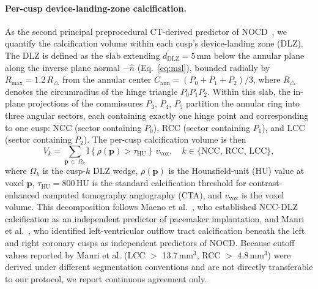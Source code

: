 \documentclass[conference]{IEEEtran}
\begin{document}

\paragraph{Per-cusp device-landing-zone calcification.}
As the second principal preprocedural CT-derived predictor of NOCD~\cite{Lemarchand2023_nocd}, we quantify the calcification volume within each cusp's device-landing zone (DLZ). The DLZ is defined as the slab extending $d_{\text{DLZ}} = 5$\,mm below the annular plane along the inverse plane normal $-\hat{n}$ (Eq.~\ref{eq:msl}), bounded radially by $R_{\max} = 1.2\,R_{\triangle}$ from the annular center $C_{\text{ann}} = (P_0 + P_1 + P_2)/3$, where $R_{\triangle}$ denotes the circumradius of the hinge triangle $P_0 P_1 P_2$. Within this slab, the in-plane projections of the commissures $P_3$, $P_4$, $P_5$ partition the annular ring into three angular sectors, each containing exactly one hinge point and corresponding to one cusp: NCC (sector containing $P_0$), RCC (sector containing $P_1$), and LCC (sector containing $P_2$). The per-cusp calcification volume is then
\begin{equation}
  V_k = \!\!\!\sum_{\mathbf{p}\,\in\,\Omega_k}\!\!\! \mathbb{I}\!\left\{\rho(\mathbf{p}) > \tau_{\mathrm{HU}}\right\}\, v_{\mathrm{vox}}, \quad k\in\{\text{NCC, RCC, LCC}\},
  \label{eq:dlz_calc}
\end{equation}
where $\Omega_k$ is the cusp-$k$ DLZ wedge, $\rho(\mathbf{p})$ is the Hounsfield-unit (HU) value at voxel $\mathbf{p}$, $\tau_{\mathrm{HU}} = 800$\,HU is the standard calcification threshold for contrast-enhanced computed tomography angiography (CTA), and $v_{\mathrm{vox}}$ is the voxel volume. This decomposition follows Maeno et al.~\cite{Maeno2017_pacemaker_tavr}, who established NCC-DLZ calcification as an independent predictor of pacemaker implantation, and Mauri et al.~\cite{Mauri2016_lvot_calcification}, who identified left-ventricular outflow tract calcification beneath the left and right coronary cusps as independent predictors of NOCD. Because cutoff values reported by Mauri et al. (LCC $>$ 13.7\,mm$^3$, RCC $>$ 4.8\,mm$^3$) were derived under different segmentation conventions and are not directly transferable to our protocol, we report continuous agreement only.
\end{document}
